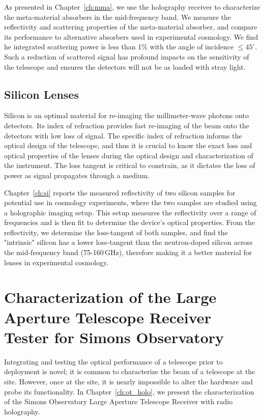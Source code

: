 As presented in Chapter~\ref{ch:mma}, we use the holography receiver to characterize the meta-material absorbers in the mid-frequency band.  We measure the reflectivity and scattering properties of the meta-material absorber, and compare its performance to alternative absorbers used in experimental cosmology.  We find he integrated scattering power is less than 1\% with the angle of incidence  $\leq45^{\circ}$.  Such a reduction of scattered signal has profound impacts on the sensitivity of the telescope and ensures the detectors will not be as loaded with stray light.

\subsection{Silicon Lenses}
Silicon is an optimal material for re-imaging the millimeter-wave photons onto detectors.  Its index of refraction provides fast re-imaging of the beam onto the detectors with low loss of signal.  The specific index of refraction informs the optical design of the telescope, and thus it is crucial to know the exact loss and optical properties of the lenses during the optical design and characterization of the instrument.  The loss tangent is critical to constrain, as it dictates the loss of power as signal propagates through a medium.

Chapter~\ref{ch:si} reports the measured reflectivity of two silicon samples for potential use in cosmology experiments, where the two samples are studied using a holographic imaging setup. This setup measures the reflectivity over a range of frequencies and is then fit to determine the device's optical properties.  From the reflectivity, we determine the loss-tangent of both samples, and find the "intrinsic" silicon has a lower loss-tangent than the neutron-doped silicon across the mid-frequency band (75-160\,GHz), therefore making it a better material for lenses in experimental cosmology.

\section{Characterization of the Large Aperture Telescope Receiver Tester for Simons Observatory}
Integrating and testing the optical performance of a telescope prior to deployment is novel; it is common to characterize the beam of a telescope at the site.  However, once at the site, it is nearly impossible to alter the hardware and probe its functionality.  In Chapter~\ref{ch:ot_holo}, we present the characterization of the Simons Observatory Large Aperture Telescope Receiver with radio holography.

